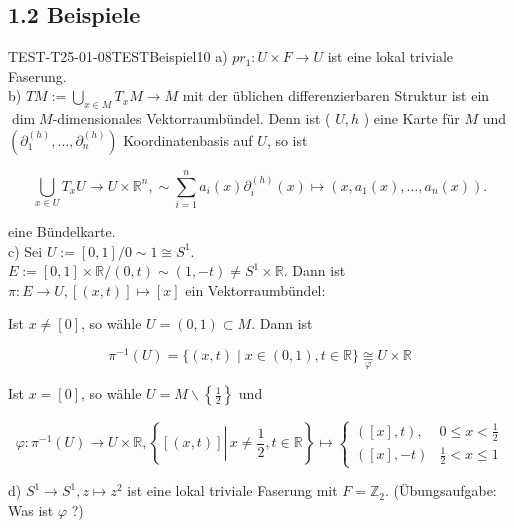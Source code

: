 \subsection*{1.2 Beispiele}
\begin{EXA}{TEST-T25-01-08}{TESTBeispiel10}
a) $p r_{1}: U \times F \rightarrow U$ ist eine lokal triviale Faserung.\\
b) $T M:=\bigcup_{x \in M} T_{x} M \rightarrow M$ mit der üblichen differenzierbaren Struktur ist ein $\operatorname{dim} M$-dimensionales Vektorraumbündel. Denn ist ( $U, h$ ) eine Karte für $M$ und $\left(\partial_{1}^{(h)}, \ldots, \partial_{n}^{(h)}\right)$ Koordinatenbasis auf $U$, so ist

$$
\bigcup_{x \in U} T_{x} U \rightarrow U \times \mathbb{R}^{n}, \sim \sum_{i=1}^{n} a_{i}(x) \partial_{i}^{(h)}(x) \mapsto\left(x, a_{1}(x), \ldots, a_{n}(x)\right) .
$$

eine Bündelkarte.\\
c) Sei $U:=[0,1] / 0 \sim 1 \cong S^{1}$.\\
$E:=[0,1] \times \mathbb{R} /(0, t) \sim(1,-t) \neq S^{1} \times \mathbb{R}$. Dann ist $\pi: E \rightarrow U,[(x, t)] \mapsto[x]$ ein Vektorraumbündel:

Ist $x \neq[0]$, so wähle $U=(0,1) \subset M$. Dann ist

$$
\pi^{-1}(U)=\{(x, t) \mid x \in(0,1), t \in \mathbb{R}\} \underset{\varphi}{\cong} U \times \mathbb{R}
$$

Ist $x=[0]$, so wähle $U=M \backslash\left\{\frac{1}{2}\right\}$ und

$$
\varphi: \pi^{-1}(U) \rightarrow U \times \mathbb{R},\left\{[(x, t)] \left\lvert\, x \neq \frac{1}{2}\right., t \in \mathbb{R}\right\} \mapsto \begin{cases}([x], t), & 0 \leq x<\frac{1}{2} \\ ([x],-t) & \frac{1}{2}<x \leq 1\end{cases}
$$

d) $S^{1} \rightarrow S^{1}, z \mapsto z^{2}$ ist eine lokal triviale Faserung mit $F=\mathbb{Z}_{2}$. (Übungsaufgabe: Was ist $\varphi$ ?)
\end{EXA}


